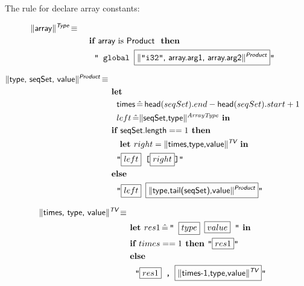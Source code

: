 The rule for declare array constants:


\begin{align*}
\begin{split}
  \trad{array}{\B{Type}} \isdef \\
   & \quad \IF \B{array} \mbox{ is \B{Product} } \THEN \\
   & \quad \quad \llvm{" global \PH{\trad{\llvm{"i32"}, array.arg1, array.arg2}{\B{Product}}}"}\\
\end{split}
\end{align*}

\begin{align*}
\begin{split}
  \trad{type, seqSet, value}{\B{Product}} \isdef \\
   & \LET\\
   & \quad \B{times} \BE \B{head}(seqSet).end - \B{head}(seqSet).start + 1\\
   & \quad left \BE \trad{seqSet,type}{ArrayType} \IN \\
   & \IF \B{seqSet.length} == 1 \THEN  \\
   & \quad \LET right = \trad{times,type,value}{\B{TV}} \IN\\
   & \quad \llvm{"\PH{left} [\PH{right}]"}  \\
   & \ELSE \\
   & \quad \llvm{"\PH{left} \PH{\trad{type,tail(seqSet),value}{\B{Product}}}"}\\
\end{split}
\end{align*}

\begin{align*}
\begin{split}
  \trad{times, type, value}{\B{TV}} \isdef \\
   &\LET res1 \BE \llvm{" \PH{type} \PH{value} "} \IN\\
   & \IF times == 1 \THEN \llvm{"\PH{res1}"} \\
   & \ELSE\\
   & \quad \llvm{"\PH{res1} , \PH{\trad{times-1,type,value}{\B{TV}}}"} \\
\end{split}
\end{align*}



